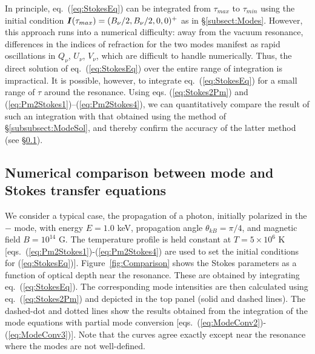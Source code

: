 \documentclass[useAMS,onecolumn,usenatbib,usegraphicx]{mn2e}
\begin{document}
In principle, eq.~(\ref{eq:StokesEq}) can be integrated from $\tau_{max}$ to $\tau_{min}$ using the 
initial condition $\mbox{\boldmath{$I$}}(\tau_{max})=(B_{\nu}/2,B_{\nu}/2,0,0)^+$ as in \S\ref{subsect:Modes}.
However, this approach runs into a numerical difficulty:
away from the vacuum resonance, differences in 
the indices of refraction for 
the two modes manifest as rapid oscillations in $Q_{\nu}$, $U_{\nu}$, $V_{\nu}$, which are difficult to 
handle numerically.
Thus, the direct 
solution of eq.~(\ref{eq:StokesEq}) over the entire range of integration is impractical.  
It is possible, however, to integrate eq.~(\ref{eq:StokesEq}) for a small range of $\tau$ around the resonance.
Using eqs. (\ref{eq:Stokes2Pm}) and (\ref{eq:Pm2Stokes1})--(\ref{eq:Pm2Stokes4}), we can quantitatively 
compare the result of such an integration with that obtained using the method of 
\S\ref{subsubsect:ModeSol}, and thereby 
confirm the 
accuracy of the latter method (see \S\ref{subsect:Comparison}).


\subsection{Numerical comparison between mode and Stokes transfer equations}
\label{subsect:Comparison}

We consider a typical case, the propagation of a photon, 
initially polarized in the $-$ mode, with energy 
$E=1.0$ keV, propagation angle $\theta_{kB}=\pi/4$, 
and magnetic field $B=10^{14}$ G.  The temperature profile is 
held constant at $T=5\times 10^{6}$ K
[eqs.~(\ref{eq:Pm2Stokes1})-(\ref{eq:Pm2Stokes4}) 
are used to set the 
initial conditions for (\ref{eq:StokesEq})].  
Figure~\ref{fig:Comparison} shows the Stokes parameters as a function of optical depth near the resonance.
These are obtained by integrating eq.~(\ref{eq:StokesEq}).
The corresponding mode intensities 
are then calculated using eq.~(\ref{eq:Stokes2Pm}) and depicted in the top panel (solid and dashed lines).
The dashed-dot and dotted lines show the results obtained from the integration of the mode equations 
with partial mode conversion [eqs.~(\ref{eq:ModeConv2})-(\ref{eq:ModeConv3})]. 
Note that the curves agree exactly except near the resonance where the modes are not well-defined.
\end{document}
